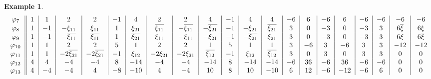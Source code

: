 \documentclass[11pt]{amsart}
\theoremstyle{plain} %
\theoremstyle{definition} %
\newtheorem{ex}[thm]{Example} %
\theoremstyle{remark} %
\begin{document}
\begin{ex}
\begin{table}[h]
\[\begin{tabular}{c||c|c|c|c|c|c|c|c|c|c|c|c|c|c|c|c|c|c|c|c}
$\varphi_7$&\(1\) & \(1\) & \(2\) & \(2\) & \(-1\) & \(4\) & \(2\) & \(2\) & \(4\) & \(-1\) & \(4\) & \(4\) & \(-6\) & \(6\) & \(-6\) & \(6\) & \(-6\) & \(-6\) & \(-6\) & \(-6\) \\
$\varphi_8$&\(1\) & \(-1\) & \(-\xi_{11}\) & \(\xi_{11}\) & \(1\) & \(\xi_{21}\) & \(\overline{\xi_{11}}\) & \(-\overline{\xi_{11}}\) & \(-\overline{\xi_{21}}\) & \(-1\) & \(-\xi_{21}\) & \(\overline{\xi_{21}}\) & \(3\) & \(0\) & \(-3\) & \(0\) & \(-3\) & \(3\) & \(6\overline{\xi}\) & \(6\xi\) \\
$\varphi_9$&\(1\) & \(-1\) & \(-\overline{\xi_{11}}\) & \(\overline{\xi_{11}}\) & \(1\) & \(\overline{\xi_{21}}\) & \(\xi_{11}\) & \(-\xi_{11}\) & \(-\xi_{21}\) & \(-1\) & \(-\overline{\xi_{21}}\) & \(\xi_{21}\) & \(3\) & \(0\) & \(-3\) & \(0\) & \(-3\) & \(3\) & \(6\xi\) & \(6\overline{\xi}\) \\
$\varphi_{10}$&\(1\) & \(1\) & \(2\) & \(2\) & \(5\) & \(1\) & \(2\) & \(2\) & \(1\) & \(5\) & \(1\) & \(1\) & \(3\) & \(-6\) & \(3\) & \(-6\) & \(3\) & \(3\) & \(-12\) & \(-12\) \\
$\varphi_{11}$&\(1\) & \(1\) & \(-2\overline{\xi_{21}}\) & \(-2\overline{\xi_{21}}\) & \(-1\) & \(\xi_{12}\) & \(-2\xi_{21}\) & \(-2\xi_{21}\) & \(\overline{\xi_{12}}\) & \(-1\) & \(\xi_{12}\) & \(\overline{\xi_{12}}\) & \(3\) & \(0\) & \(3\) & \(0\) & \(3\) & \(3\) & \(0\) & \(0\) \\
$\varphi_{12}$&\(4\) & \(4\) & \(-4\) & \(-4\) & \(8\) & \(-14\) & \(-4\) & \(-4\) & \(-14\) & \(8\) & \(-14\) & \(-14\) & \(-6\) & \(36\) & \(-6\) & \(36\) & \(-6\) & \(-6\) & \(0\) & \(0\) \\
$\varphi_{13}$&\(4\) & \(-4\) & \(-4\) & \(4\) & \(-8\) & \(-10\) & \(4\) & \(-4\) & \(10\) & \(8\) & \(10\) & \(-10\) & \(6\) & \(12\) & \(-6\) & \(-12\) & \(-6\) & \(6\) & \(0\) & \(0\)
\end{tabular}
\]
\\





\end{table}
\end{ex}
\end{document}
